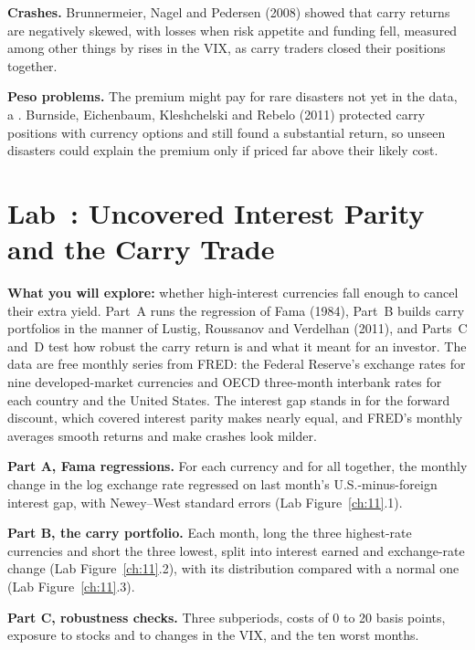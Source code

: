 \textbf{Crashes.} Brunnermeier, Nagel and Pedersen (2008) showed that carry returns are negatively skewed, with losses when risk appetite and funding fell, measured among other things by rises in the VIX, as carry traders closed their positions together.

\textbf{Peso problems.} The premium might pay for rare disasters not yet in the data, a . Burnside, Eichenbaum, Kleshchelski and Rebelo (2011) protected carry positions with currency options and still found a substantial return, so unseen disasters could explain the premium only if priced far above their likely cost.

\section{Lab~\thechapter: Uncovered Interest Parity and the Carry Trade}
\label{sec:06-lab}

\textbf{What you will explore:} whether high-interest currencies fall enough to cancel their extra yield. Part~A runs the regression of Fama (1984), Part~B builds carry portfolios in the manner of Lustig, Roussanov and Verdelhan (2011), and Parts~C and~D test how robust the carry return is and what it meant for an investor. The data are free monthly series from FRED: the Federal Reserve's exchange rates for nine developed-market currencies and OECD three-month interbank rates for each country and the United States. The interest gap stands in for the forward discount, which covered interest parity makes nearly equal, and FRED's monthly averages smooth returns and make crashes look milder.

\textbf{Part A, Fama regressions.} For each currency and for all together, the monthly change in the log exchange rate regressed on last month's U.S.-minus-foreign interest gap, with Newey--West standard errors (Lab Figure~\ref{ch:11}.1).

\textbf{Part B, the carry portfolio.} Each month, long the three highest-rate currencies and short the three lowest, split into interest earned and exchange-rate change (Lab Figure~\ref{ch:11}.2), with its distribution compared with a normal one (Lab Figure~\ref{ch:11}.3).

\textbf{Part C, robustness checks.} Three subperiods, costs of 0 to 20 basis points, exposure to stocks and to changes in the VIX, and the ten worst months.

